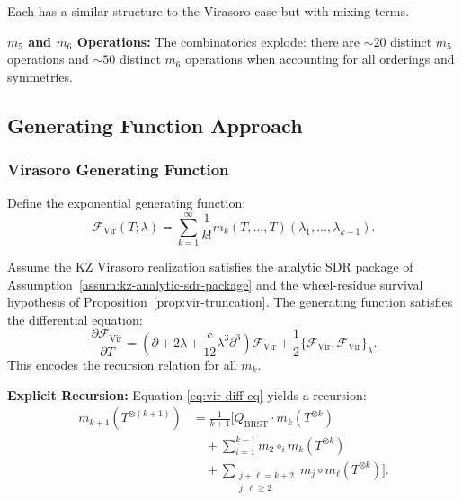 Each has a similar structure to the Virasoro case but with mixing terms.

\textbf{$m_5$ and $m_6$ Operations:}
The combinatorics explode: there are $\sim 20$ distinct $m_5$ operations and $\sim 50$ distinct $m_6$ operations when accounting for all orderings and symmetries.

\subsection{Generating Function Approach}

\subsubsection{Virasoro Generating Function}

Define the exponential generating function:
\begin{equation}
\mathcal{F}_{\text{Vir}}(T; \lambda) = \sum_{k=1}^\infty \frac{1}{k!} m_k(T, \ldots, T)(\lambda_1, \ldots, \lambda_{k-1}).
\end{equation}

\begin{theorem}
Assume the KZ Virasoro realization satisfies the analytic SDR package
of Assumption~\textup{\ref{assum:kz-analytic-sdr-package}} and the
wheel-residue survival hypothesis of
Proposition~\textup{\ref{prop:vir-truncation}}.
The generating function satisfies the differential equation:
\begin{equation}
\frac{\partial \mathcal{F}_{\text{Vir}}}{\partial T} = \left( \partial + 2\lambda + \frac{c}{12}\lambda^3 \partial^3 \right) \mathcal{F}_{\text{Vir}} + \frac{1}{2} \{\mathcal{F}_{\text{Vir}}, \mathcal{F}_{\text{Vir}}\}_\lambda.
\end{equation}
This encodes the recursion relation for all $m_k$.
\end{theorem}

\textbf{Explicit Recursion:}
Equation \eqref{eq:vir-diff-eq} yields a recursion:
\begin{align}
m_{k+1}(T^{\otimes (k+1)}) &= \frac{1}{k+1} \Bigg[ Q_{\text{BRST}} \cdot m_k(T^{\otimes k})\\
&\quad + \sum_{i=1}^{k-1} m_2 \circ_i m_k(T^{\otimes k})\\
&\quad + \sum_{\substack{j+\ell = k+2 \\ j,\ell \geq 2}} m_j \circ m_\ell(T^{\otimes k}) \Bigg].
\end{align}

